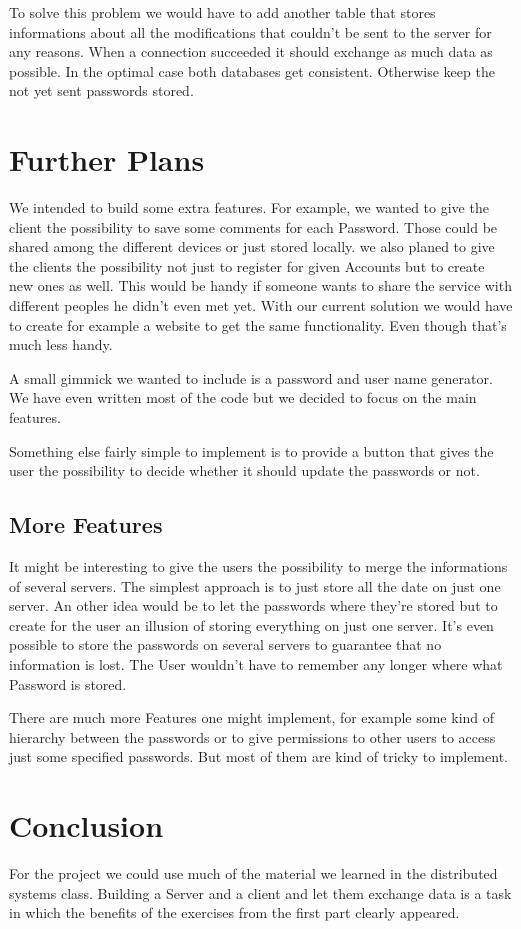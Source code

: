\documentclass{report}
\begin{document}
To solve this problem we would have to add another table that stores informations about all the modifications that couldn't be sent to the server for any reasons. When a connection succeeded it should exchange as much data as possible. In the optimal case both databases get consistent. Otherwise keep the not yet sent passwords stored. 

\section{Further Plans}
We intended to build some extra features. For example, we wanted to give the client the possibility to save some comments for each Password. Those could be shared among the different devices or just stored locally. 
we also planed to give the clients the possibility not just to register for given Accounts but to create new ones as well. This would be handy if someone wants to share the service with different peoples he didn't even met yet. With our current solution we would have to create for example a website to get the same functionality.
Even though that's much less handy.

A small gimmick we wanted to include is a password and user name  generator. We have even written most of the code but we decided to focus on the main features. 

Something else fairly simple to implement is to provide a button that gives the user the possibility to decide whether it should update the passwords or not.  

\subsection{More Features}
It might be interesting to give the users the possibility to merge the informations of several servers. The simplest approach is to just store all the date on just one server. An other idea would be to let the passwords where they're stored but to create for the user an illusion of storing everything on just one server. It's even possible to store the passwords on several servers to guarantee that no information is lost. The User wouldn't have to remember any longer where what Password is stored.

There are much more Features one might implement, for example some kind of hierarchy between the passwords or to give permissions to other users to access just some specified passwords. But most of them are kind of tricky to implement.

\section{Conclusion}
For the project we could use much of the material we learned in the distributed systems class. Building a Server and a client and let them exchange data is a task in which the benefits of the exercises from the first part clearly appeared. 
\end{document}
